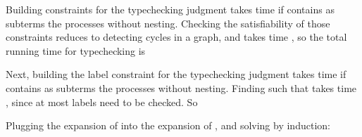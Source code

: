 \documentclass{sigplanconf}
\begin{document}
Building constraints for the typechecking judgment  takes time 
 if  contains as subterms the  processes  without nesting. Checking the satisfiability of those constraints reduces to detecting cycles in a graph, and takes time , so the total running time for typechecking is 

Next, building the label constraint for the typechecking judgment  takes time  if  contains as subterms the processes  without nesting. Finding  such that  takes time , since at most  labels need to be checked. So 

Plugging the expansion of  into the expansion of , and solving by induction: 
\end{document}
